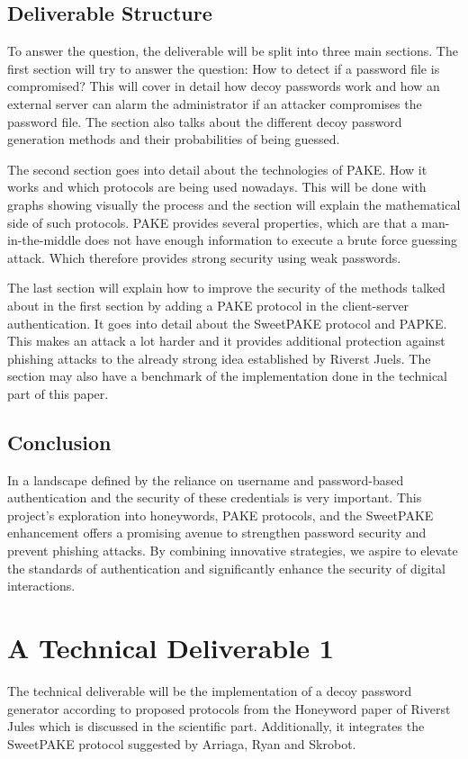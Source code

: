 \documentclass[conference,compsoc]{IEEEtran}
\begin{document}
\subsection{Deliverable Structure} To answer the question, the deliverable will
be split into three main sections. The first section will try to answer the
question: How to detect if a password file is compromised? This will cover in
detail how decoy passwords work and how an external server can alarm the
administrator if an attacker compromises the password file. The section also
talks about the different decoy password generation methods and their
probabilities of being guessed. 

The second section goes into detail about the technologies of PAKE. How it
works and which protocols are being used nowadays. This will be done with
graphs showing visually the process and the section will explain the
mathematical side of such protocols. PAKE provides several properties, which
are that a man-in-the-middle does not have enough information to execute a
brute force guessing attack. Which therefore provides strong security using
weak passwords.

The last section will explain how to improve the security of the methods talked
about in the first section by adding a PAKE protocol in the client-server
authentication. It goes into detail about the SweetPAKE \cite{sweetpake}
protocol and PAPKE\cite{papke}. This makes an attack a lot harder and it provides
additional protection against phishing attacks to the already strong idea
established by Riverst Juels. The section may also have a benchmark of the
implementation done in the technical part of this paper.

\subsection{Conclusion} In a landscape defined by the reliance on username and
password-based authentication and the security of these credentials is very
important. This project's exploration into honeywords, PAKE protocols, and the
SweetPAKE enhancement offers a promising avenue to strengthen password security
and prevent phishing attacks. By combining innovative strategies, we aspire to
elevate the standards of authentication and significantly enhance the security
of digital interactions.

\section{A Technical Deliverable 1 } The technical deliverable will be the
implementation of a decoy password generator according to proposed protocols
from the Honeyword paper \cite{juels2013honeywords} of Riverst Jules which is
discussed in the scientific part. Additionally, it integrates the SweetPAKE
protocol \cite{sweetpake} suggested by Arriaga, Ryan and Skrobot.
\end{document}
